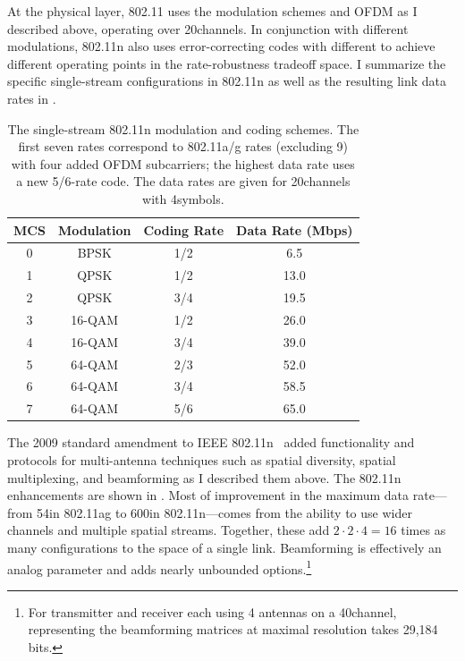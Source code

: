 At the physical layer, 802.11 uses the modulation schemes and OFDM as I described above, operating over 20\MHz channels. In conjunction with different modulations, 802.11n also uses error-correcting codes with different  to achieve different operating points in the rate-robustness tradeoff space. I summarize the specific single-stream configurations in 802.11n as well as the resulting link data rates in .

\begin{table}[t]
\centering
\begin{tabular}{cccc}
\toprule
\bf MCS & \bf Modulation & \bf Coding Rate & \bf Data Rate (Mbps) \\
\midrule
0 & BPSK & 1/2 & 6.5 \\
1 & QPSK & 1/2 & 13.0\\
2 & QPSK & 3/4 & 19.5\\
3 & 16-QAM & 1/2 & 26.0\\
4 & 16-QAM & 3/4 & 39.0\\
5 & 64-QAM & 2/3 & 52.0\\
6 & 64-QAM & 3/4 & 58.5\\
7 & 64-QAM & 5/6 & 65.0\\
\bottomrule
\end{tabular}
\caption[The 802.11n single-stream rates.]{\label{tab:siso_mcs} The single-stream 802.11n modulation and coding schemes. The first seven rates correspond to 802.11a/g rates (excluding 9\Mbps) with four added OFDM subcarriers; the highest data rate uses a new 5/6-rate code. The data rates are given for 20\MHz channels with 4\ms symbols.}
\end{table}

The 2009 standard amendment to IEEE 802.11n~\cite{80211n} added functionality and protocols for multi-antenna techniques such as spatial diversity, spatial multiplexing, and beamforming as I described them above. The 802.11n enhancements are shown in . Most of improvement in the maximum data rate---from 54\Mbps in 802.11ag to 600\Mbps in 802.11n---comes from the ability to use wider channels and multiple spatial streams. Together, these add $2\cdot2\cdot4=16$ times as many configurations to the space of a single link. Beamforming is effectively an analog parameter and adds nearly unbounded options.\footnote{For transmitter and receiver each using 4 antennas on a 40\MHz channel, representing the beamforming matrices at maximal resolution takes 29,184 bits.}

